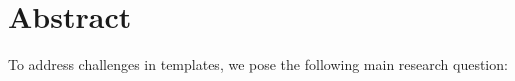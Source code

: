 \chapter*{Abstract}

To address challenges in templates, we pose the following main research question:

\mainrq







